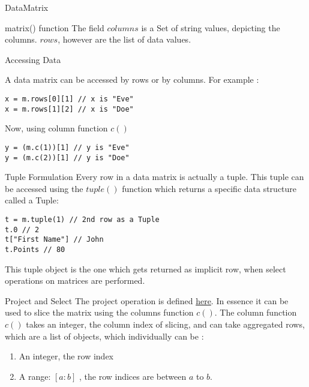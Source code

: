 \begin{section}{DataMatrix}
\begin{subsection}{matrix() function}
The field $columns$ is a Set of string values, depicting the columns.
$rows$, however are the list of data values. 
 
\end{subsection}

\begin{subsection}{Accessing Data}

A data matrix can be accessed by rows or by columns.
For example :

\begin{lstlisting}[style=JexlStyle]
x = m.rows[0][1] // x is "Eve"
x = m.rows[1][2] // x is "Doe" 
\end{lstlisting}

Now, using column function $c()$ 

\begin{lstlisting}[style=JexlStyle]
y = (m.c(1))[1] // y is "Eve"
y = (m.c(2))[1] // y is "Doe" 
\end{lstlisting}

\end{subsection}

\begin{subsection}{Tuple Formulation}
Every row in a data matrix is actually a tuple.
This tuple can be accessed using the $tuple()$ function which returns a specific 
data structure called a Tuple:

\begin{lstlisting}[style=JexlStyle]
t = m.tuple(1) // 2nd row as a Tuple 
t.0 // 2
t["First Name"] // John
t.Points // 80 
\end{lstlisting}

This  tuple object is the one which gets returned as implicit row, 
when select operations on matrices are performed.

\end{subsection}

\begin{subsection}{Project and Select}
The project operation is defined \href{https://en.wikipedia.org/wiki/Projection\_(relational\_algebra)}{here}.
In essence it can be used to slice the matrix using the columns function $c()$.
The column function $c()$ takes an integer, the column index of slicing, and can take aggregated 
rows, which are a list of objects, which individually can be :

\begin{enumerate}
\item{ An integer, the row index }
\item{ A range: $[a:b]$ , the row indices are between $a$ to $b$. }
\end{enumerate}


\end{subsection}
\end{section}
